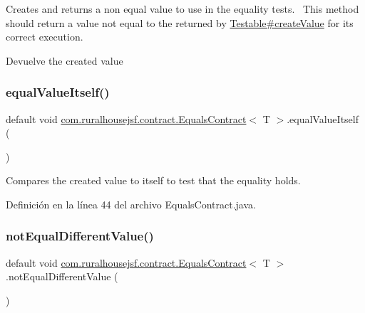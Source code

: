 Creates and returns a non equal value to use in the equality tests.~\newline
 This method should return a value not equal to the returned by \mbox{\hyperlink{interfacecom_1_1ruralhousejsf_1_1contract_1_1_testable_ae4546a381488faaba1ef7c0f8688de9c}{Testable\#create\+Value}} for its correct execution.

\begin{DoxyReturn}{Devuelve}
the created value 
\end{DoxyReturn}
\mbox{\label{interfacecom_1_1ruralhousejsf_1_1contract_1_1_equals_contract_a5daf9e73e1147c8765c0fcf3d3dddbb0}} 
\subsubsection{\texorpdfstring{equalValueItself()}{equalValueItself()}}
{\footnotesize\ttfamily default void \mbox{\hyperlink{interfacecom_1_1ruralhousejsf_1_1contract_1_1_equals_contract}{com.\+ruralhousejsf.\+contract.\+Equals\+Contract}}$<$ T $>$.equal\+Value\+Itself (\begin{DoxyParamCaption}{ }\end{DoxyParamCaption})}

Compares the created value to itself to test that the equality holds. 

Definición en la línea 44 del archivo Equals\+Contract.\+java.

\mbox{\label{interfacecom_1_1ruralhousejsf_1_1contract_1_1_equals_contract_acaa5c1c071bf63a3e629977c73131fc8}} 
\subsubsection{\texorpdfstring{notEqualDifferentValue()}{notEqualDifferentValue()}}
{\footnotesize\ttfamily default void \mbox{\hyperlink{interfacecom_1_1ruralhousejsf_1_1contract_1_1_equals_contract}{com.\+ruralhousejsf.\+contract.\+Equals\+Contract}}$<$ T $>$.not\+Equal\+Different\+Value (\begin{DoxyParamCaption}{ }\end{DoxyParamCaption})}

